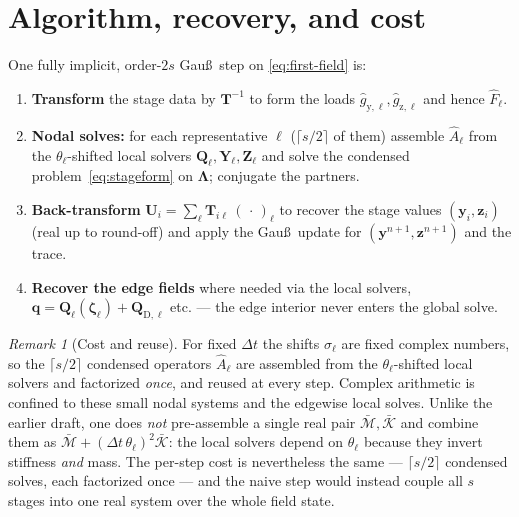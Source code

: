 \documentclass[11pt]{article}
\theoremstyle{remark}
\newtheorem*{remark}{Remark}
\renewcommand{\vec}{\boldsymbol}
\newcommand{\bvec}[1]{\vec{#1}}
\newcommand{\vLambda}{\vec\Lambda}       %
\newcommand{\mT}{\mathbf{T}}
\newcommand{\Mbar}{\bar{\mathcal M}}     %
\newcommand{\Kbar}{\bar{\mathcal K}}     %
\newcommand{\dt}{\Delta t}
\begin{document}
\section{Algorithm, recovery, and cost}

One fully implicit, order-$2s$ Gau\ss\ step on \eqref{eq:first-field} is:
\begin{enumerate}
\item \textbf{Transform} the stage data by $\mT^{-1}$ to form the loads
$\widehat g_{\mathrm y,\ell},\widehat g_{\mathrm z,\ell}$ and hence $\widehat F_\ell$.
\item \textbf{Nodal solves:} for each representative $\ell$ ($\lceil s/2\rceil$ of
them) assemble $\widehat A_\ell$ from the $\theta_\ell$-shifted local solvers
$\bvec Q_\ell,\bvec Y_\ell,\bvec Z_\ell$ and solve the condensed
problem~\eqref{eq:stageform} on $\vLambda$; conjugate the partners.
\item \textbf{Back-transform} $\bvec U_i=\sum_\ell\mT_{i\ell}\,(\,\cdot\,)_\ell$ to
recover the stage values $(\bvec y_i,\bvec z_i)$ (real up to round-off) and apply
the Gau\ss\ update for $(\bvec y^{n+1},\bvec z^{n+1})$ and the trace.
\item \textbf{Recover the edge fields} where needed via the local solvers,
$\bvec q=\bvec Q_\ell(\vec\zeta_\ell)+\bvec Q_{\mathrm D,\ell}$ etc. --- the edge
interior never enters the global solve.
\end{enumerate}

\begin{remark}[Cost and reuse]
For fixed $\dt$ the shifts $\sigma_\ell$ are fixed complex numbers, so the
$\lceil s/2\rceil$ condensed operators $\widehat A_\ell$ are assembled from the
$\theta_\ell$-shifted local solvers and factorized \emph{once}, and reused at every
step. Complex arithmetic is confined to these small nodal systems and the edgewise
local solves. Unlike the earlier draft, one does \emph{not} pre-assemble a single
real pair $\Mbar,\Kbar$ and combine them as $\Mbar+(\dt\,\theta_\ell)^2\Kbar$: the
local solvers depend on $\theta_\ell$ because they invert stiffness \emph{and}
mass. The per-step cost is nevertheless the same --- $\lceil s/2\rceil$ condensed
solves, each factorized once --- and the naive step would instead couple all $s$
stages into one real system over the whole field state.
\end{remark}
\end{document}
